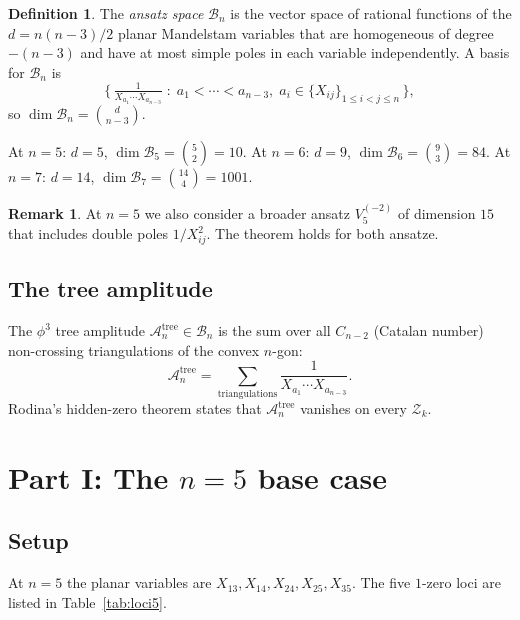 \documentclass[11pt]{article}
\theoremstyle{plain}
\theoremstyle{definition}
\newtheorem{definition}[theorem]{Definition}
\newtheorem{remark}[theorem]{Remark}
\newcommand{\cA}{\mathcal{A}}
\newcommand{\cB}{\mathcal{B}}
\newcommand{\cZ}{\mathcal{Z}}
\begin{document}
\begin{definition}
The \emph{ansatz space} $\cB_n$ is the vector space of rational functions of the
$d = n(n-3)/2$ planar Mandelstam variables that are homogeneous of degree $-(n-3)$
and have at most simple poles in each variable independently. A basis for $\cB_n$ is
\[
\Big\{\, \tfrac{1}{X_{a_1} \cdots X_{a_{n-3}}} \;:\;
a_1 < \cdots < a_{n-3},\; a_i \in \{X_{ij}\}_{1 \le i < j \le n} \,\Big\},
\]
so $\dim \cB_n = \binom{d}{n-3}$.
\end{definition}

At $n=5$: $d = 5$, $\dim \cB_5 = \binom{5}{2} = 10$.
At $n=6$: $d = 9$, $\dim \cB_6 = \binom{9}{3} = 84$.
At $n=7$: $d = 14$, $\dim \cB_7 = \binom{14}{4} = 1001$.

\begin{remark}
At $n = 5$ we also consider a broader ansatz $V_5^{(-2)}$ of dimension $15$
that includes double poles $1/X_{ij}^2$. The theorem holds for both ansatze.
\end{remark}

\subsection{The tree amplitude}

The $\phi^3$ tree amplitude $\cA_n^{\mathrm{tree}} \in \cB_n$ is the sum over all
$C_{n-2}$ (Catalan number) non-crossing triangulations of the convex $n$-gon:
\[
\cA_n^{\mathrm{tree}} = \sum_{\text{triangulations}} \frac{1}{X_{a_1} \cdots X_{a_{n-3}}}.
\]
Rodina's hidden-zero theorem states that $\cA_n^{\mathrm{tree}}$ vanishes on every
$\cZ_k$.

\section{Part I: The $n=5$ base case}
\label{sec:n5}

\subsection{Setup}

At $n=5$ the planar variables are $X_{13}, X_{14}, X_{24}, X_{25}, X_{35}$. The five
$1$-zero loci are listed in Table~\ref{tab:loci5}.
\end{document}
